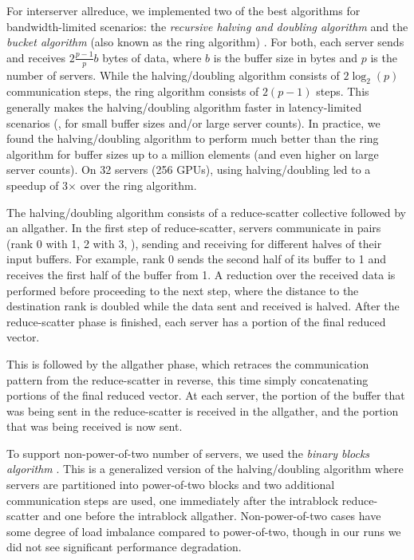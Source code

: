 \documentclass[10pt,twocolumn,letterpaper]{article}
\def\x{\times}
\begin{document}
For interserver allreduce, we implemented two of the best algorithms for bandwidth-limited scenarios: the \emph{recursive halving and doubling algorithm} \cite{rabenseifner2004optimization, thakur2005optimization} and the \emph{bucket algorithm} (also known as the ring algorithm) \cite{barnett1994interprocessor}. For both, each server sends and receives $2 \frac{p - 1}{p} b$ bytes of data, where $b$ is the buffer size in bytes and $p$ is the number of servers. While the halving/doubling algorithm consists of $2 \log_2(p)$ communication steps, the ring algorithm consists of $2 (p - 1)$ steps. This generally makes the halving/doubling algorithm faster in latency-limited scenarios (\ie, for small buffer sizes and/or large server counts). In practice, we found the halving/doubling algorithm to perform much better than the ring algorithm for buffer sizes up to a million elements (and even higher on large server counts). On 32 servers (256 GPUs), using halving/doubling led to a speedup of 3$\x$ over the ring algorithm.

The halving/doubling algorithm consists of a reduce-scatter collective followed by an allgather. In the first step of reduce-scatter, servers communicate in pairs (rank 0 with 1, 2 with 3, \etc), sending and receiving for different halves of their input buffers. For example, rank 0 sends the second half of its buffer to 1 and receives the first half of the buffer from 1. A reduction over the received data is performed before proceeding to the next step, where the distance to the destination rank is doubled while the data sent and received is halved. After the reduce-scatter phase is finished, each server has a portion of the final reduced vector.

This is followed by the allgather phase, which retraces the communication pattern from the reduce-scatter in reverse, this time simply concatenating portions of the final reduced vector. At each server, the portion of the buffer that was being sent in the reduce-scatter is received in the allgather, and the portion that was being received is now sent.

To support non-power-of-two number of servers, we used the \emph{binary blocks algorithm} \cite{rabenseifner2004optimization}. This is a generalized version of the halving/doubling algorithm where servers are partitioned into power-of-two blocks and two additional communication steps are used, one immediately after the intrablock reduce-scatter and one before the intrablock allgather.  Non-power-of-two cases have some degree of load imbalance compared to power-of-two, though in our runs we did not see significant performance degradation.
\end{document}
